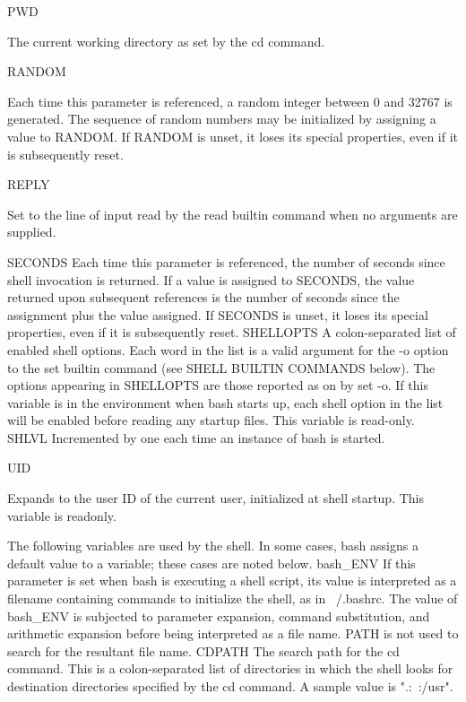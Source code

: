 \documentclass[11pt]{article}
\begin{document}
PWD

The current working directory as set by the cd command.

RANDOM

Each time this parameter is referenced, a random integer between 0 and 32767 is generated. The sequence of random numbers may be initialized by assigning a value to RANDOM. If RANDOM is unset, it loses its special properties, even if it is subsequently reset.

REPLY

Set to the line of input read by the read builtin command when no arguments are supplied.

SECONDS
Each time this parameter is referenced, the number of seconds since shell invocation is returned. If a value is assigned to SECONDS, the value returned upon subsequent references is the number of seconds since the assignment plus the value assigned. If SECONDS is unset, it loses its special properties, even if it is subsequently reset.
SHELLOPTS
A colon-separated list of enabled shell options. Each word in the list is a valid argument for the -o option to the set builtin command (see SHELL BUILTIN COMMANDS below). The options appearing in SHELLOPTS are those reported as on by set -o. If this variable is in the environment when bash starts up, each shell option in the list will be enabled before reading any startup files. This variable is read-only.
SHLVL
Incremented by one each time an instance of bash is started.

UID

Expands to the user ID of the current user, initialized at shell startup. This variable is readonly.

The following variables are used by the shell. In some cases, bash assigns a default value to a variable; these cases are noted below.
bash\_ENV
If this parameter is set when bash is executing a shell script, its value is interpreted as a filename containing commands to initialize the shell, as in ~/.bashrc. The value of bash\_ENV is subjected to parameter expansion, command substitution, and arithmetic expansion before being interpreted as a file name. PATH is not used to search for the resultant file name.
CDPATH
The search path for the cd command. This is a colon-separated list of directories in which the shell looks for destination directories specified by the cd command. A sample value is ".:~:/usr".
\end{document}
